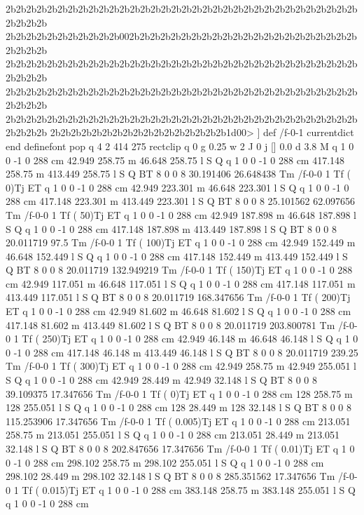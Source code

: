 2b2b2b2b2b2b2b2b2b2b2b2b2b2b2b2b2b2b2b2b2b2b2b2b2b2b2b2b2b2b2b2b2b2b2b2b2b2b
2b2b2b2b2b2b2b2b2b2b2b002b2b2b2b2b2b2b2b2b2b2b2b2b2b2b2b2b2b2b2b2b2b2b2b2b2b
2b2b2b2b2b2b2b2b2b2b2b2b2b2b2b2b2b2b2b2b2b2b2b2b2b2b2b2b2b2b2b2b2b2b2b2b2b2b
2b2b2b2b2b2b2b2b2b2b2b2b2b2b2b2b2b2b2b2b2b2b2b2b2b2b2b2b2b2b2b2b2b2b2b2b2b2b
2b2b2b2b2b2b2b2b2b2b2b2b2b2b2b2b2b2b2b2b2b2b2b2b2b2b2b2b2b2b2b2b2b2b2b2b2b2b
2b2b2b2b2b2b2b2b2b2b2b2b2b2b2b2b2b1d00>
] def
/f-0-1 currentdict end definefont pop
q 4 2 414 275 rectclip q
0 g
0.25 w
2 J
0 j
[] 0.0 d
3.8 M q 1 0 0 -1 0 288 cm
42.949 258.75 m 46.648 258.75 l S Q
q 1 0 0 -1 0 288 cm
417.148 258.75 m 413.449 258.75 l S Q
BT
8 0 0 8 30.191406 26.648438 Tm
/f-0-0 1 Tf
( 0)Tj
ET
q 1 0 0 -1 0 288 cm
42.949 223.301 m 46.648 223.301 l S Q
q 1 0 0 -1 0 288 cm
417.148 223.301 m 413.449 223.301 l S Q
BT
8 0 0 8 25.101562 62.097656 Tm
/f-0-0 1 Tf
( 50)Tj
ET
q 1 0 0 -1 0 288 cm
42.949 187.898 m 46.648 187.898 l S Q
q 1 0 0 -1 0 288 cm
417.148 187.898 m 413.449 187.898 l S Q
BT
8 0 0 8 20.011719 97.5 Tm
/f-0-0 1 Tf
( 100)Tj
ET
q 1 0 0 -1 0 288 cm
42.949 152.449 m 46.648 152.449 l S Q
q 1 0 0 -1 0 288 cm
417.148 152.449 m 413.449 152.449 l S Q
BT
8 0 0 8 20.011719 132.949219 Tm
/f-0-0 1 Tf
( 150)Tj
ET
q 1 0 0 -1 0 288 cm
42.949 117.051 m 46.648 117.051 l S Q
q 1 0 0 -1 0 288 cm
417.148 117.051 m 413.449 117.051 l S Q
BT
8 0 0 8 20.011719 168.347656 Tm
/f-0-0 1 Tf
( 200)Tj
ET
q 1 0 0 -1 0 288 cm
42.949 81.602 m 46.648 81.602 l S Q
q 1 0 0 -1 0 288 cm
417.148 81.602 m 413.449 81.602 l S Q
BT
8 0 0 8 20.011719 203.800781 Tm
/f-0-0 1 Tf
( 250)Tj
ET
q 1 0 0 -1 0 288 cm
42.949 46.148 m 46.648 46.148 l S Q
q 1 0 0 -1 0 288 cm
417.148 46.148 m 413.449 46.148 l S Q
BT
8 0 0 8 20.011719 239.25 Tm
/f-0-0 1 Tf
( 300)Tj
ET
q 1 0 0 -1 0 288 cm
42.949 258.75 m 42.949 255.051 l S Q
q 1 0 0 -1 0 288 cm
42.949 28.449 m 42.949 32.148 l S Q
BT
8 0 0 8 39.109375 17.347656 Tm
/f-0-0 1 Tf
( 0)Tj
ET
q 1 0 0 -1 0 288 cm
128 258.75 m 128 255.051 l S Q
q 1 0 0 -1 0 288 cm
128 28.449 m 128 32.148 l S Q
BT
8 0 0 8 115.253906 17.347656 Tm
/f-0-0 1 Tf
( 0.005)Tj
ET
q 1 0 0 -1 0 288 cm
213.051 258.75 m 213.051 255.051 l S Q
q 1 0 0 -1 0 288 cm
213.051 28.449 m 213.051 32.148 l S Q
BT
8 0 0 8 202.847656 17.347656 Tm
/f-0-0 1 Tf
( 0.01)Tj
ET
q 1 0 0 -1 0 288 cm
298.102 258.75 m 298.102 255.051 l S Q
q 1 0 0 -1 0 288 cm
298.102 28.449 m 298.102 32.148 l S Q
BT
8 0 0 8 285.351562 17.347656 Tm
/f-0-0 1 Tf
( 0.015)Tj
ET
q 1 0 0 -1 0 288 cm
383.148 258.75 m 383.148 255.051 l S Q
q 1 0 0 -1 0 288 cm
